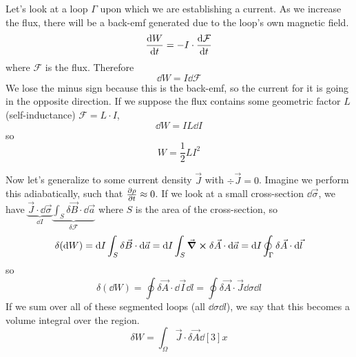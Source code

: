 \documentclass[a4paper,twoside,master.tex]{subfiles}
\begin{document}
Let's look at a loop $ \Gamma $ upon which we are establishing a current. As we increase the flux, there will be a back-emf generated due to the loop's own magnetic field.
\begin{equation}
    \dv{W}{t}= -I \cdot \dv{\mathcal{F}}{t}
\end{equation}
where $ \mathcal{F} $ is the flux. Therefore
\begin{equation}
    \dd W = I \dd \mathcal{F}
\end{equation}
We lose the minus sign because this is the back-emf, so the current for it is going in the opposite direction. If we suppose the flux contains some geometric factor $ L $  (self-inductance) $ \mathcal{F} = L \cdot I $,
\begin{equation}
    \dd W = I L \dd I
\end{equation}
so
\begin{equation}
    W = \frac{1}{2} L I^2
\end{equation}

Now let's generalize to some current density $ \vec{J} $ with $ \div{ \vec{J}} = 0 $. Imagine we perform this adiabatically, such that $ \pdv{\rho}{t} \approx 0 $. If we look at a small cross-section $ \dd{ \vec{\sigma}} $, we have $ \underbrace{\vec{J} \cdot \dd{ \vec{\sigma}}}_{\dd{I}}\underbrace{\int_{S} \delta \vec{B} \cdot \dd{ \vec{a}}}_{\delta \mathcal{F}} $ where $ S $ is the area of the cross-section, so
\begin{equation}
    \delta (\dd{W})= \dd{I} \int_S \delta \vec{B} \cdot \dd{ \vec{a}} = \dd{I} \int_S \curl{\delta \vec{A}} \cdot \dd{ \vec{a}} = \dd{I} \oint_{\Gamma}\delta \vec{A} \cdot \dd{ \vec{l}}
\end{equation}
so
\begin{equation}
    \delta(\dd{W}) = \oint \delta \vec{A} \cdot \dd{ \vec{I}} \dd{l} = \oint \delta \vec{A} \cdot \vec{J} \dd{\sigma} \dd{l}
\end{equation}
If we sum over all of these segmented loops (all $ \dd{\sigma} \dd{l} $), we say that this becomes a volume integral over the region.
\begin{equation}
    \delta W = \int_{\Omega} \vec{J} \cdot \delta \vec{A} \dd[3]{x}
\end{equation}
\end{document}
